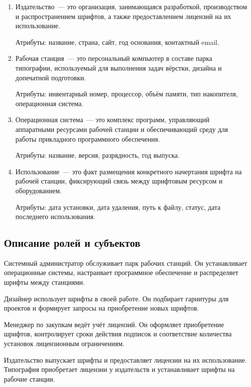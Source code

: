 \begin{enumerate}
    Атрибуты: тип, срок действия, максимальное число станций, стоимость, дата приобретения.

    \item Издательство~--- это организация, занимающаяся разработкой, производством и распространением шрифтов, а также предоставлением лицензий на их использование.

    Атрибуты: название, страна, сайт, год основания, контактный email.

    \item Рабочая станция~--- это персональный компьютер в составе парка типографии, используемый для выполнения задач вёрстки, дизайна и допечатной подготовки.

    Атрибуты: инвентарный номер, процессор, объём памяти, тип накопителя, операционная система.

    \item Операционная система~--- это комплекс программ, управляющий аппаратными ресурсами рабочей станции и обеспечивающий среду для работы прикладного программного обеспечения.

    Атрибуты: название, версия, разрядность, год выпуска.

    \item Использование~--- это факт размещения конкретного начертания шрифта на рабочей станции, фиксирующий связь между шрифтовым ресурсом и оборудованием.

    Атрибуты: дата установки, дата удаления, путь к файлу, статус, дата последнего использования.
\end{enumerate}

\subsection{Описание ролей и субъектов}

Системный администратор обслуживает парк рабочих станций. Он устанавливает операционные системы, настраивает программное обеспечение и распределяет шрифты между станциями.

Дизайнер использует шрифты в своей работе. Он подбирает гарнитуры для проектов и формирует запросы на приобретение новых шрифтов.

Менеджер по закупкам ведёт учёт лицензий. Он оформляет приобретение шрифтов, контролирует сроки действия подписок и соответствие количества установок лицензионным ограничениям.

Издательство выпускает шрифты и предоставляет лицензии на их использование. Типография приобретает лицензии у издательств и устанавливает шрифты на рабочие станции.


